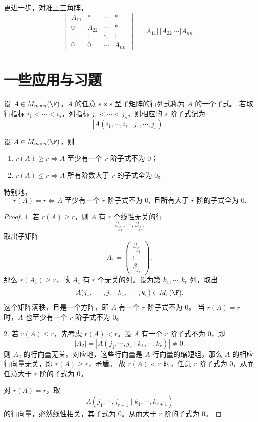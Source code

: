 更进一步，对准上三角阵，
\[
\begin{vmatrix}
	A_{11}&*&\cdots&*\\
	0&A_{22}&\cdots&*\\
	\vdots&\vdots&\ddots&\vdots\\
	0&0&\cdots&A_{nn}
\end{vmatrix}
=|A_{11}|\,|A_{22}|\cdots|A_{nn}|.
\]

\section{一些应用与习题}

\begin{definition}\label{3.9.1}\label{p1:concept:c3-l2632}
	设 $A\in M_{m\times n}(\F)$。$A$ 的任意 $s\times s$ 型子矩阵的行列式称为 $A$ 的一个子式。
	若取行指标 $i_1<\cdots<i_s$，列指标 $j_1<\cdots<j_s$，则相应的 $s$ 阶子式记为
	\[
	\left|A(i_1,\cdots,i_s\mid j_1,\cdots,j_s)\right|.
	\]
\end{definition}

\begin{proposition}\label{3.9.2}
	设 $A\in M_{m\times n}(\F)$，则
	\begin{enumerate}
		\item $r(A)\geq r\Longleftrightarrow A$ 至少有一个 $r$ 阶子式不为 $0$；
		\item $r(A)\leq r\Longleftrightarrow A$ 所有阶数大于 $r$ 的子式全为 $0$。
	\end{enumerate}
	特别地，
	\[
	r(A)=r
	\Longleftrightarrow
	A\text{ 至少有一个 }r\text{ 阶子式不为 }0,
	\text{ 且所有大于 }r\text{ 阶的子式全为 }0.
	\]
\end{proposition}

\begin{proof}
	$1.$ 若 $r(A)\geq r$，则 $A$ 有 $r$ 个线性无关的行
	\[
	\beta_{j_1},\cdots,\beta_{j_r}.
	\]
	取出子矩阵
	\[
	A_1=\begin{pmatrix}
		\beta_{j_1}\\
		\vdots\\
		\beta_{j_r}
	\end{pmatrix},
	\]
	那么 $r(A_1)\geq r$，故 $A_1$ 有 $r$ 个无关的列。设为第 $k_1,\cdots,k_r$ 列，取出
	\[
	A(j_1,\cdots,j_r\mid k_1,\cdots,k_r)\in M_r(\F).
	\]
	这个矩阵满秩，且是一个方阵，即 $A$ 有一个 $r$ 阶子式不为 $0$。
	当 $r(A)=r$ 时，$A$ 也至少有一个 $r$ 阶子式不为 $0$。
	
	$2.$ 若 $r(A)\leq r$，先考虑 $r(A)<r$。设 $A$ 有一个 $r$ 阶子式不为 $0$，即
	\[
	|A_2|=\left|A(j_1,\cdots,j_r\mid k_1,\cdots,k_r)\right|\neq0.
	\]
	则 $A_2$ 的行向量无关。对应地，这些行向量是 $A$ 行向量的缩短组，那么 $A$ 的相应行向量无关，即 $r(A)\geq r$，矛盾。
	故 $r(A)<r$ 时，任意 $r$ 阶子式为 $0$，从而任意大于 $r$ 阶的子式为 $0$。
	
	对 $r(A)=r$，取
	\[
	A(j_1,\cdots,j_{r+1}\mid k_1,\cdots,k_{r+1})
	\]
	的行向量，必然线性相关，其子式为 $0$。从而大于 $r$ 阶的子式为 $0$。
\end{proof}


